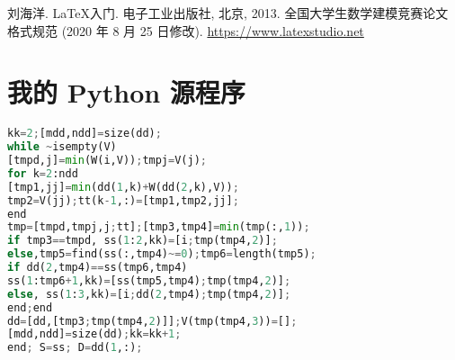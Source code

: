 \documentclass[bwprint]{gmcmthesis}
\begin{document}
\begin{thebibliography}{9}%
    刘海洋.
    \newblock \LaTeX {}入门\allowbreak[J].
    \newblock 电子工业出版社, 北京, 2013.
    全国大学生数学建模竞赛论文格式规范 (2020 年 8 月 25 日修改).
     \url{https://www.latexstudio.net}
\end{thebibliography}






\newpage
\appendix
\section{我的 Python 源程序}
\begin{lstlisting}[language=Python]%设置不同语言即可。
kk=2;[mdd,ndd]=size(dd);
while ~isempty(V)
[tmpd,j]=min(W(i,V));tmpj=V(j);
for k=2:ndd
[tmp1,jj]=min(dd(1,k)+W(dd(2,k),V));
tmp2=V(jj);tt(k-1,:)=[tmp1,tmp2,jj];
end
tmp=[tmpd,tmpj,j;tt];[tmp3,tmp4]=min(tmp(:,1));
if tmp3==tmpd, ss(1:2,kk)=[i;tmp(tmp4,2)];
else,tmp5=find(ss(:,tmp4)~=0);tmp6=length(tmp5);
if dd(2,tmp4)==ss(tmp6,tmp4)
ss(1:tmp6+1,kk)=[ss(tmp5,tmp4);tmp(tmp4,2)];
else, ss(1:3,kk)=[i;dd(2,tmp4);tmp(tmp4,2)];
end;end
dd=[dd,[tmp3;tmp(tmp4,2)]];V(tmp(tmp4,3))=[];
[mdd,ndd]=size(dd);kk=kk+1;
end; S=ss; D=dd(1,:);


 \end{lstlisting}
\end{document}
